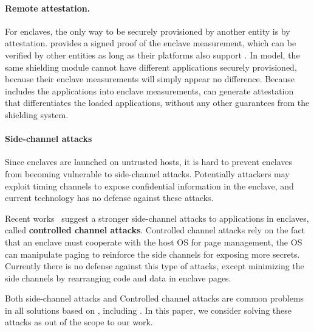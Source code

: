 \paragraph{Remote attestation.}
For enclaves, the only way to be securely provisioned by another entity
is by attestation.
\sgx{} provides a signed proof of the enclave measurement,
which can be verified by other entities as long as their platforms
also support \sgx{}.
In \haven{} model, the same shielding module cannot have different applications
securely provisioned, because their enclave measurements will simply
appear no difference.
Because \sysname{} includes the applications into enclave measurements,
\sgx{} can generate attestation that differentiates the loaded applications,
without any other guarantees from the shielding system.

\paragraph{Side-channel attacks}
Since enclaves are launched on untrusted hosts, it is hard to prevent
enclaves from becoming vulnerable to side-channel attacks.
Potentially attackers may exploit timing channels to expose confidential
information in the enclave, and current \sgx{} technology has no defense
against these attacks.

Recent works~\citep{xu15controlledchannel} suggest a stronger
side-channel attacks to applications in enclaves,
called {\bf controlled channel attacks}.
Controlled channel attacks rely on the fact that an enclave must cooperate
with the host OS for page management,
the OS can manipulate paging to reinforce the side channels
for exposing more secrets.
Currently there is no defense against this type of attacks, except minimizing
the side channels by rearranging code and data in enclave pages.

Both side-channel attacks and Controlled channel attacks
are common problems in all solutions based on \sgx{},
including \haven{}. In this paper, we consider solving these attacks as
out of the scope to our work.


